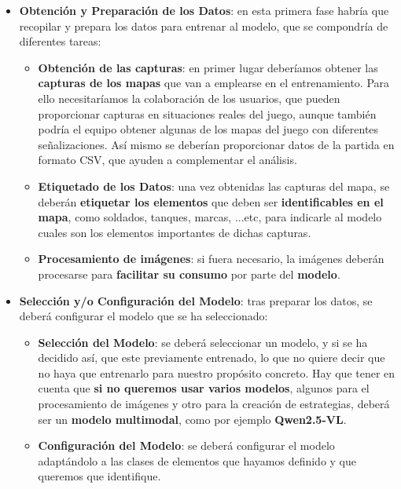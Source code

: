 \begin{itemize}
	\item \textbf{Obtención y Preparación de los Datos}: en esta primera fase habría que recopilar y prepara los datos para entrenar al modelo, que se compondría de diferentes tareas:
	\begin{itemize}
		\item \textbf{Obtención de las capturas}: en primer lugar deberíamos obtener las \textbf{capturas de los mapas} que van a emplearse en el entrenamiento. Para ello necesitaríamos la colaboración de los usuarios, que pueden proporcionar capturas en situaciones reales del juego, aunque también podría el equipo obtener algunas de los mapas del juego con diferentes señalizaciones. Así mismo se deberían proporcionar datos de la partida en formato CSV, que ayuden a complementar el análisis.
		\item \textbf{Etiquetado de los Datos}: una vez obtenidas las capturas del mapa, se deberán \textbf{etiquetar los elementos} que deben ser \textbf{identificables en el mapa}, como soldados, tanques, marcas, ...etc, para indicarle al modelo cuales son los elementos importantes de dichas capturas.
		\item \textbf{Procesamiento de imágenes}: si fuera necesario, la imágenes deberán procesarse para \textbf{facilitar su consumo} por parte del \textbf{modelo}.
	\end{itemize}
	
	\item \textbf{Selección y/o Configuración del Modelo}: tras preparar los datos, se deberá configurar el modelo que se ha seleccionado:
	\begin{itemize}
		\item  \textbf{Selección del Modelo}: se deberá seleccionar un modelo, y si se ha decidido así, que este previamente entrenado, lo que no quiere decir que no haya que entrenarlo para nuestro propósito concreto. Hay que tener en cuenta que \textbf{si no queremos usar varios modelos}, algunos para el procesamiento de imágenes y otro para la creación de estrategias, deberá ser un \textbf{modelo multimodal}, como por ejemplo \textbf{Qwen2.5-VL}.
		\item \textbf{Configuración del Modelo}: se deberá configurar el modelo adaptándolo a las clases de elementos que hayamos definido y que queremos que identifique.
	\end{itemize}
	

\end{itemize}
